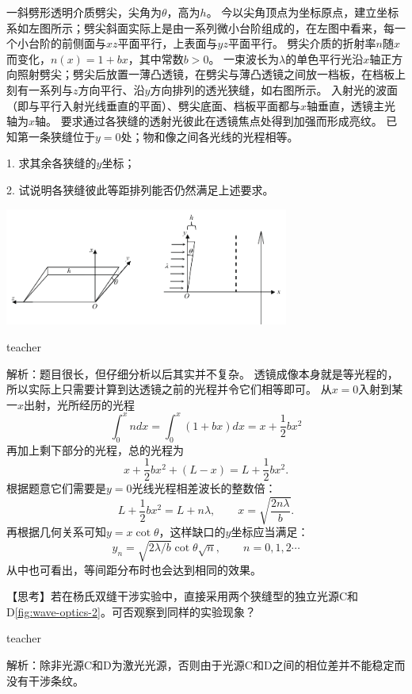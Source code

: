 \begin{example}
	一斜劈形透明介质劈尖，尖角为$\theta$，高为$h$。
	今以尖角顶点为坐标原点，建立坐标系如左图所示；劈尖斜面实际上是由一系列微小台阶组成的，在左图中看来，每一个小台阶的前侧面与$xz$平面平行，上表面与$yz$平面平行。
	劈尖介质的折射率$n$随$x $而变化，$n(x)=1+bx$，其中常数$b>0$。
	一束波长为$\lambda$的单色平行光沿$x$轴正方向照射劈尖；劈尖后放置一薄凸透镜，在劈尖与薄凸透镜之间放一档板，在档板上刻有一系列与$z$方向平行、沿$y$方向排列的透光狭缝，如右图所示。
	入射光的波面（即与平行入射光线垂直的平面）、劈尖底面、档板平面都与$x$轴垂直，透镜主光轴为$x$轴。
	要求通过各狭缝的透射光彼此在透镜焦点处得到加强而形成亮纹。 已知第一条狭缝位于$y=0$处；物和像之间各光线的光程相等。 
	
	1. 求其余各狭缝的$y$坐标；
	
	2. 试说明各狭缝彼此等距排列能否仍然满足上述要求。
	\begin{flushright}
		\includegraphics[width = 0.7\textwidth]{images/wave-optics-4.pdf} 
	\end{flushright}
	\begin{taggedblock}{teacher}
		
		解析：题目很长，但仔细分析以后其实并不复杂。
		透镜成像本身就是等光程的，所以实际上只需要计算到达透镜之前的光程并令它们相等即可。
		从$x=0$入射到某一$x$出射，光所经历的光程
		\[
		\int_0^xndx = \int_0^x (1+bx)dx = x + \frac{1}{2}bx^2
		\]
		再加上剩下部分的光程，总的光程为
		\[
		x + \frac{1}{2}bx^2+(L-x) = L+\frac{1}{2}bx^2.
		\]
		根据题意它们需要是$y=0$光线光程相差波长的整数倍：
		\[
		L+\frac{1}{2}bx^2 = L+n\lambda ,\qquad x = \sqrt{\frac{2n\lambda}{b}}.
		\]
		再根据几何关系可知$y = x\cot \theta$，这样缺口的$y$坐标应当满足：
		\[
		y_n = \sqrt{2\lambda/b}\cot\theta\sqrt{n},\qquad n=0,1,2\cdots 
		\]
		从中也可看出，等间距分布时也会达到相同的效果。
	\end{taggedblock}
\end{example}


\begin{example}
	【思考】若在杨氏双缝干涉实验中，直接采用两个狭缝型的独立光源C和D\ref{fig:wave-optics-2}。可否观察到同样的实验现象？
	\begin{taggedblock}{teacher}
		
		解析：除非光源C和D为激光光源，否则由于光源C和D之间的相位差并不能稳定而没有干涉条纹。
	\end{taggedblock}
\end{example}%



